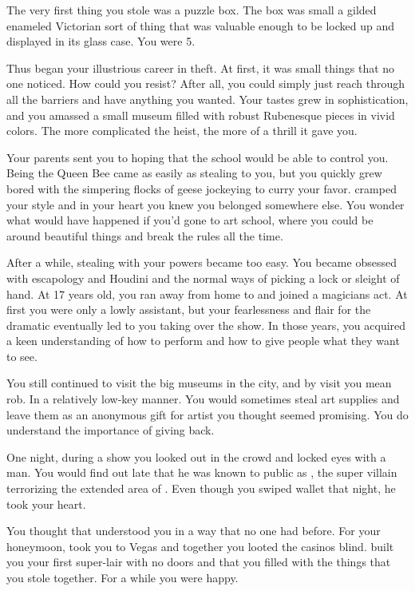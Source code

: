 \documentclass[char]{LRSguildcamp1}
\begin{document}
\name{\cGrandma{}}

The very first thing you stole was a puzzle box. The box was small a gilded enameled Victorian sort of thing that was valuable enough to be locked up and displayed in its glass case. You were 5. 

Thus began your illustrious career in theft. At first, it was small things that no one noticed. How could you resist? After all, you could simply just reach through all the barriers and have anything you wanted. Your tastes grew in sophistication, and you amassed a small museum filled with robust Rubenesque pieces in vivid colors. The more complicated the heist, the more of a thrill it gave you. 

Your parents sent you to \pSuperSchool{} hoping that the school would be able to control you. Being the Queen Bee came as  easily as stealing to you, but you quickly grew bored with the simpering flocks of geese jockeying to curry your favor. \pSuperSchool{} cramped your style and in your heart you knew you belonged somewhere else. You wonder what would have happened if you'd gone to art school, where you could be around beautiful things and break the rules all the time. 

After a while, stealing with your powers became too easy. You became obsessed with escapology and Houdini and the normal ways of picking a lock or sleight of hand. At 17 years old, you ran away from home to \pCityGrandma{} and joined a magicians act. At first you were only a lowly assistant, but your fearlessness and flair for the dramatic eventually led to you taking over the show. In those years, you acquired a keen understanding of how to perform and how to give people what they want to see. 

You still continued to visit the big museums in the city, and by visit you mean rob. In a relatively low-key manner. You would sometimes steal art supplies and leave them as an anonymous gift for artist you thought seemed promising. You do understand the importance of giving back. 

One night, during a show you looked out in the crowd and locked eyes with a man. You would find out late that he was known to public as \cGS{}, the super villain terrorizing the extended area of \pCityO{}. Even though you swiped \cGS{\their} wallet that night, he took your heart. 

You thought that \cGS{} understood you in a way that no one had before. For your honeymoon, \cGS{\they} took you to Vegas and together you looted the casinos blind. \cGS{\They} built you your first super-lair with no doors and that you filled with the things that you stole together. For a while you were happy. 
\end{document}
